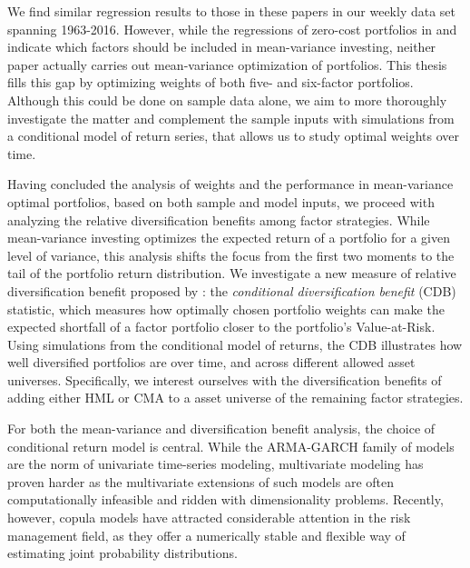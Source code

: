 We find similar regression results to those in these papers in our weekly data set spanning 1963-2016. However, while the regressions of zero-cost portfolios in \textcite{FF2015} and \textcite{Asness2015} indicate which factors should be included in mean-variance investing, neither paper actually carries out mean-variance optimization of portfolios. This thesis fills this gap by optimizing weights of both five- and six-factor portfolios. Although this could be done on sample data alone, we aim to more thoroughly investigate the matter and complement the sample inputs with simulations from a conditional model of return series, that allows us to study optimal weights over time.

Having concluded the analysis of weights and the performance in mean-variance optimal portfolios, based on both sample and model inputs, we proceed with analyzing the relative diversification benefits among factor strategies. While mean-variance investing optimizes the expected return of a portfolio for a given level of variance, this analysis shifts the focus from the first two moments to the tail of the portfolio return distribution. We investigate a new measure of relative diversification benefit proposed by \textcite{ChristoffersenErrunzaJacobLanglois2012}: the \emph{conditional diversification benefit} (CDB) statistic, which measures how optimally chosen portfolio weights can make the expected shortfall of a factor portfolio closer to the portfolio's Value-at-Risk. Using simulations from the conditional model of returns, the CDB illustrates how well diversified portfolios are over time, and across different allowed asset universes. Specifically, we interest ourselves with the diversification benefits of adding either HML or CMA to a asset universe of the remaining factor strategies.

For both the mean-variance and diversification benefit analysis, the choice of conditional return model is central. While the ARMA-GARCH family of models are the norm of univariate time-series modeling, multivariate modeling has proven harder as the multivariate extensions of such models are often computationally infeasible and ridden with dimensionality problems. Recently, however, copula models have attracted considerable attention in the risk management field, as they offer a numerically stable and flexible way of estimating joint probability distributions. 


